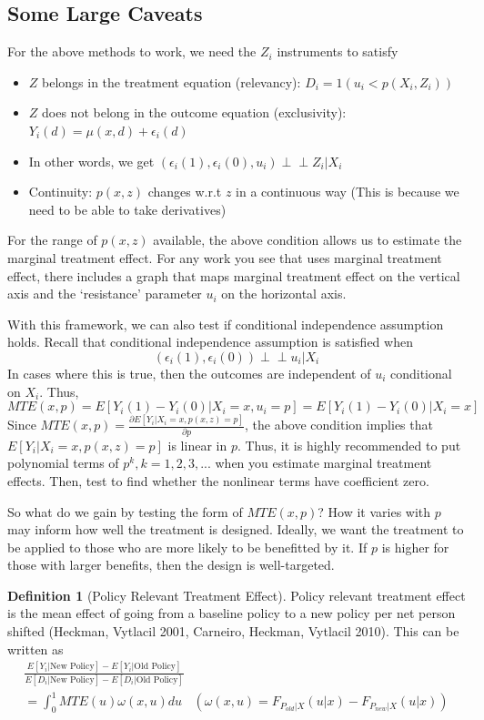 \documentclass[12pt]{article}
\theoremstyle{definition}
\newtheorem{definition}{Definition}[section]
\theoremstyle{property}
\theoremstyle{assumption}
\theoremstyle{example}
\theoremstyle{comment}
\begin{document}
\subsection{Some Large Caveats}
For the above methods to work, we need the $Z_i$ instruments to satisfy
\begin{itemize}
\item $Z$ belongs in the treatment equation (relevancy): $D_i=1(u_i<p(X_i,Z_i))$
\item $Z$ does not belong in the outcome equation (exclusivity): $Y_i(d)=\mu(x,d)+\epsilon_i(d)$
\item In other words, we get $(\epsilon_i(1), \epsilon_i(0), u_i) \perp\!\!\!\perp Z_i|X_i$
\item Continuity: $p(x,z)$ changes w.r.t $z$ in a continuous way (This is because we need to be able to take derivatives)
\end{itemize}
For the range of $p(x,z)$ available, the above condition allows us to estimate the marginal treatment effect. For any work you see that uses marginal treatment effect, there includes a graph that maps marginal treatment effect on the vertical axis and the `resistance' parameter $u_i$ on the horizontal axis. \par
With this framework, we can also test if conditional independence assumption holds. Recall that conditional independence assumption is satisfied when
\[
(\epsilon_i(1),\epsilon_i(0)) \perp\!\!\!\perp u_i|X_i
\]
In cases where this is true, then the outcomes are independent of $u_i$ conditional on $X_i$. Thus, 
\[
MTE(x,p)=E[Y_i(1)-Y_i(0)|X_i=x, u_i=p]=E[Y_i(1)-Y_i(0)|X_i=x]
\]
Since $MTE(x,p)=\frac{\partial E[Y_i | X_i=x, p(x, z)=p]}{\partial p}$, the above condition implies that $E[Y_i|X_i=x, p(x, z)=p]$ is linear in $p$. Thus, it is highly recommended to put polynomial terms of $p^k, k=1,2,3,...$ when you estimate marginal treatment effects. Then, test to find whether the nonlinear terms have coefficient zero. 
\par 
So what do we gain by testing the form of $MTE(x,p)$? How it varies with $p$ may inform how well the treatment is designed. Ideally, we want the treatment to be applied to those who are more likely to be benefitted by it. If $p$ is higher for those with larger benefits, then the design is well-targeted.
\begin{mdframed}[backgroundcolor=blue!5] 
\begin{definition}[Policy Relevant Treatment Effect]  Policy relevant treatment effect is the mean effect of going from a baseline policy to a new policy per net person shifted (Heckman, Vytlacil 2001, Carneiro, Heckman, Vytlacil 2010). This can be written as
\begin{gather*}
\frac{E[Y_i|\text{New Policy}]-E[Y_i|\text{Old Policy}]}{E[D_i|\text{New Policy}]-E[D_i|\text{Old Policy}]}\\
=\int_0^1MTE(u)\omega(x,u) du\  \  \ \ (\omega(x,u)=F_{P_{old}|X}(u|x)-F_{P_{new}|X}(u|x))
\end{gather*}
\end{definition}
\end{mdframed}
\end{document}
